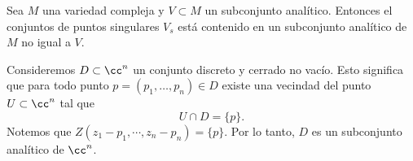     \begin{propo}\parencite[Chap 0, Sec. 2.2]{griffiths}\label{puntossingulares}
    	Sea $M$ una variedad compleja y $V\subset M$ un subconjunto analítico. Entonces el conjuntos de puntos singulares $V_s$ está contenido en un subconjunto analítico de $M$ no igual a $V$.
    \end{propo} 
    
   
    \begin{example}
    	Consideremos $D\subset \cc^n$ un conjunto discreto y cerrado no vacío. Esto significa que para todo punto $p=(p_1,\dots,p_n)\in D$ existe una vecindad del punto $U\subset\cc^n$ tal que
    	\begin{equation*}
    		U\cap D =\{p\}.
    	\end{equation*} 
    	Notemos que $Z(z_1-p_1,\cdots,z_n-p_n)=\{p\}$. Por lo tanto, $D$ es un subconjunto analítico de $\cc^n$.
    \end{example}
    
